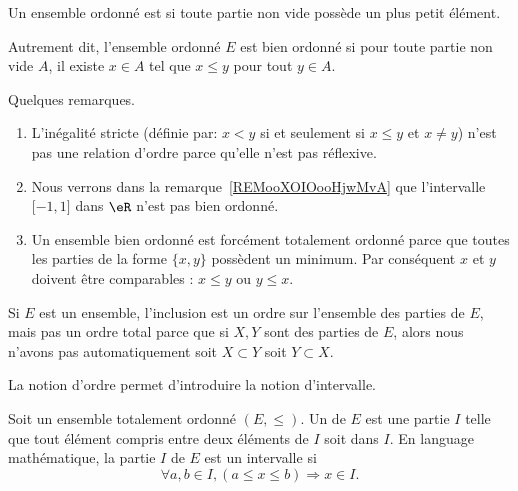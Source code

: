 \begin{definition}   \label{DEFooLJEAooBLGsiS}
	Un ensemble ordonné est  si toute partie non vide possède un plus petit élément.
\end{definition}

Autrement dit, l'ensemble ordonné \( E\) est bien ordonné si pour toute partie non vide \( A\), il existe \( x\in A\) tel que \( x\leq y\) pour tout \( y\in A\).

\begin{normaltext}
	Quelques remarques.
	\begin{enumerate}
		\item
		      L'inégalité stricte (définie par: \( x<y\) si et seulement si \( x\leq y\) et \( x\neq y\)) n'est pas une relation d'ordre parce qu'elle n'est pas réflexive.
		\item
		      Nous verrons dans la remarque~\ref{REMooXOIOooHjwMvA} que l'intervalle \( \mathopen[ -1 , 1 \mathclose]\) dans \( \eR\) n'est pas bien ordonné.
		\item
		      Un ensemble bien ordonné est forcément totalement ordonné parce que toutes les parties de la forme \( \{ x,y \}\) possèdent un minimum. Par conséquent \( x\) et \( y\) doivent être comparables : \( x\leq y\) ou \( y\leq x\).
	\end{enumerate}
\end{normaltext}

\begin{example}
	Si \( E\) est un ensemble, l'inclusion est un ordre sur l'ensemble des parties de \( E\), mais pas un ordre total parce que si \( X,Y\) sont des parties de \( E\), alors nous n'avons pas automatiquement soit \( X\subset Y\) soit \( Y\subset X\).
\end{example}

La notion d'ordre permet d'introduire la notion d'intervalle.

\begin{definition}  \label{DefEYAooMYYTz}
	Soit un ensemble totalement ordonné \( (E,\leq)\). Un  de \( E\) est une partie \( I\) telle que tout élément compris entre deux éléments de \( I \) soit dans \( I \). En language mathématique, la partie \( I \) de \( E\) est un intervalle si
	\[
		\forall a,b\in I,(a\leq x\leq b)\Rightarrow x\in I.
	\]
\end{definition}

